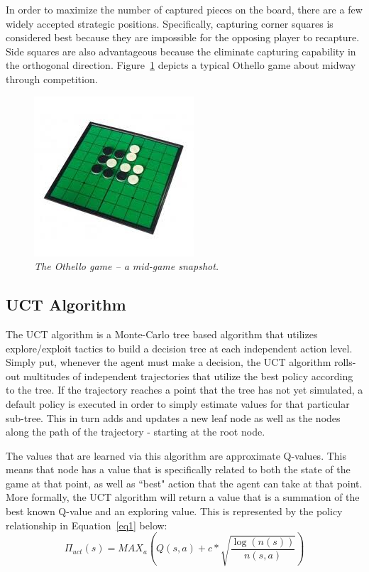 \documentclass[12pt,letterpaper]{article}
\begin{document}
In order to maximize the number of captured pieces on the board, there are a few widely accepted strategic positions.  Specifically, capturing corner squares is considered best because they are impossible for the opposing player to recapture. Side squares are also advantageous because the eliminate capturing capability in the orthogonal direction. Figure~\ref{fig1} depicts a typical Othello game about midway through competition.

\begin{figure}[!h]
\begin{center}
\includegraphics[scale=1]{othello_board}
\caption{\textit{The Othello game -- a mid-game snapshot.}}
\label{fig1}
\end{center}
\end{figure}

\subsection{UCT Algorithm}
The UCT algorithm is a Monte-Carlo tree based algorithm that utilizes explore/exploit tactics to build a decision tree at each independent action level. Simply put, whenever the agent must make a decision, the UCT algorithm rolls-out multitudes of independent trajectories that utilize the best policy according to the tree. If the trajectory reaches a point that the tree has not yet simulated, a default policy is executed in order to simply estimate values for that particular sub-tree.  This in turn adds and updates a new leaf node as well as the nodes along the path of the trajectory - starting at the root node.

The values that are learned via this algorithm are approximate Q-values.  This means that node has a value that is specifically related to both the state of the game at that point, as well as ``best" action that the agent can take at that point. More formally, the UCT algorithm will return a value that is a summation of the best known Q-value and an exploring value.  This is represented by the policy relationship in Equation~\ref{eq1} below:
\begin{equation}
\label{eq1}
\Pi_{uct}(s) = MAX_a \left( Q(s,a) + c*\sqrt{\frac{\log(n(s))}{n(s,a)}} \right)
\end{equation}
\end{document}
